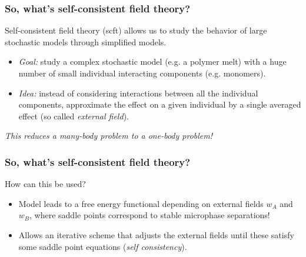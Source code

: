 \begin{frame}[t]
    \frametitle{So, what's self-consistent field theory?}

    Self-consistent field theory (scft) allows us to study the behavior of large stochastic models through simplified models.

    \vfill
    \begin{itemize}
        \item {} \emph{Goal:} study a complex stochastic model (e.g. a polymer melt) with a huge number of small individual interacting components (e.g. monomers).
        \item {} \emph{Idea:} instead of considering interactions between all the individual components, approximate the effect on a given individual by a single averaged effect (so called \emph{external field}).
    \end{itemize}

    \vfill
    \centering
    \emph{This reduces a many-body problem to a one-body problem!}
\end{frame}

\begin{frame}[t]
    \frametitle{So, what's self-consistent field theory?}

    How can this be used?


    \begin{itemize}
        \item Model leads to a free energy functional depending on external fields $w_{A}$ and $w_{B}$, where saddle points correspond to stable microphase separations!
        \item {} Allows an iterative scheme that adjusts the external fields until these satisfy some saddle point equations (\emph{self consistency}).
    \end{itemize}
\end{frame}

